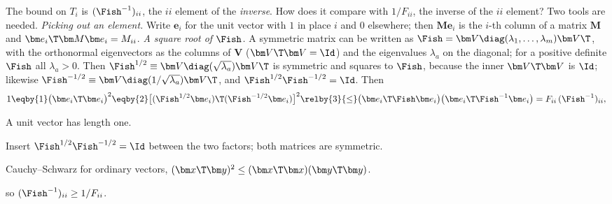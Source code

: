 The bound on $T_i$ is $(\Fish^{-1})_{ii}$, the $ii$ element of the \emph{inverse}. How does it compare with
$1/F_{ii}$, the inverse of the $ii$ element? Two tools are needed. \emph{Picking out an element.} Write $\bm e_i$
for the unit vector with $1$ in place $i$ and $0$ elsewhere; then $\bm M\bm e_i$ is the $i$-th column of a matrix
$\bm M$ and $\bm e_i\T\bm M\bm e_i=M_{ii}$. \emph{A square root of $\Fish$.} A symmetric matrix can be written as
$\Fish=\bm V\diag(\lambda_1,\dots,\lambda_m)\bm V\T$, with the orthonormal eigenvectors as the columns of $\bm V$
($\bm V\T\bm V=\Id$) and the eigenvalues $\lambda_a$ on the diagonal; for a positive definite $\Fish$ all
$\lambda_a>0$. Then $\Fish^{1/2}\equiv\bm V\diag(\sqrt{\lambda_a})\bm V\T$ is symmetric and squares to $\Fish$, because the
inner $\bm V\T\bm V$ is $\Id$; likewise $\Fish^{-1/2}\equiv\bm V\diag(1/\sqrt{\lambda_a})\bm V\T$, and
$\Fish^{1/2}\Fish^{-1/2}=\Id$. Then
\begin{align}
  1\eqby{1}\bigl(\bm e_i\T\bm e_i\bigr)^2
  \eqby{2}\bigl[(\Fish^{1/2}\bm e_i)\T(\Fish^{-1/2}\bm e_i)\bigr]^2
  \relby{3}{\le}\bigl(\bm e_i\T\Fish\bm e_i\bigr)\bigl(\bm e_i\T\Fish^{-1}\bm e_i\bigr)
  =F_{ii}\,(\Fish^{-1})_{ii},
  \label{10a:eq:diag-ineq}
\end{align}
\begin{explain}
  \item A unit vector has length one.
  \item Insert $\Fish^{1/2}\Fish^{-1/2}=\Id$ between the two factors; both matrices are symmetric.
  \item Cauchy--Schwarz for ordinary vectors, $(\bm x\T\bm y)^2\le(\bm x\T\bm x)(\bm y\T\bm y)$.
\end{explain}
so $(\Fish^{-1})_{ii}\ge1/F_{ii}$.

